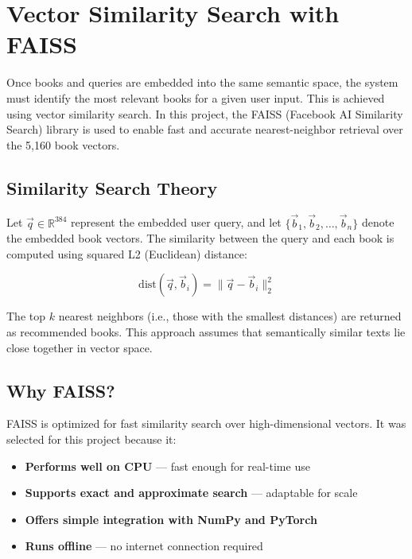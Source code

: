 \chapter{Vector Similarity Search with FAISS}
\label{chapter:faiss}

Once books and queries are embedded into the same semantic space, the system must identify the most relevant books for a given user input. This is achieved using vector similarity search. In this project, the FAISS (Facebook AI Similarity Search) library is used to enable fast and accurate nearest-neighbor retrieval over the 5,160 book vectors.

\section{Similarity Search Theory}
\label{sec:similarity-theory}

Let \( \vec{q} \in \mathbb{R}^{384} \) represent the embedded user query, and let \( \{\vec{b}_1, \vec{b}_2, \dots, \vec{b}_n\} \) denote the embedded book vectors. The similarity between the query and each book is computed using squared L2 (Euclidean) distance:

\begin{equation}
    \text{dist}(\vec{q}, \vec{b}_i) = \|\vec{q} - \vec{b}_i\|_2^2
\end{equation}

The top \( k \) nearest neighbors (i.e., those with the smallest distances) are returned as recommended books. This approach assumes that semantically similar texts lie close together in vector space.

\section{Why FAISS?}
\label{sec:faiss-choice}

FAISS is optimized for fast similarity search over high-dimensional vectors. It was selected for this project because it:

\begin{itemize}
    \item \textbf{Performs well on CPU} — fast enough for real-time use
    \item \textbf{Supports exact and approximate search} — adaptable for scale
    \item \textbf{Offers simple integration with NumPy and PyTorch}
    \item \textbf{Runs offline} — no internet connection required
\end{itemize}

